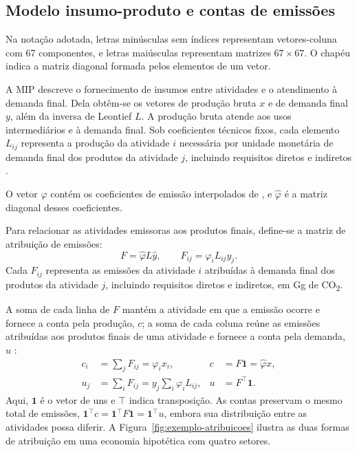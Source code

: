 \subsection{Modelo insumo-produto e contas de emissões}
\label{sec:derivacao}
\label{sec:atribuicoes}

Na notação adotada, letras minúsculas sem índices representam vetores-coluna com 67 componentes, e letras maiúsculas representam matrizes $67\times67$. O chapéu indica a matriz diagonal formada pelos elementos de um vetor.

A MIP descreve o fornecimento de insumos entre atividades e o atendimento à demanda final. Dela obtêm-se os vetores de produção bruta $x$ e de demanda final $y$, além da inversa de Leontief $L$. A produção bruta atende aos usos intermediários e à demanda final. Sob coeficientes técnicos fixos, cada elemento $L_{ij}$ representa a produção da atividade $i$ necessária por unidade monetária de demanda final dos produtos da atividade $j$, incluindo requisitos diretos e indiretos \parencite{millerBlair2009}.

O vetor $\varphi$ contém os coeficientes de emissão interpolados de \textcite{sanguinetAzzoni2024}, e $\widehat{\varphi}$ é a matriz diagonal desses coeficientes.

Para relacionar as atividades emissoras aos produtos finais, define-se a matriz de atribuição de emissões:
\begin{equation}
F=\widehat{\varphi}L\widehat y,\qquad F_{ij}=\varphi_iL_{ij}y_j.
\label{eq:matriz-atribuicao}
\end{equation}
Cada $F_{ij}$ representa as emissões da atividade $i$ atribuídas à demanda final dos produtos da atividade $j$, incluindo requisitos diretos e indiretos, em Gg de CO\textsubscript{2}.

A soma de cada linha de $F$ mantém a atividade em que a emissão ocorre e fornece a conta pela produção, $c$; a soma de cada coluna reúne as emissões atribuídas aos produtos finais de uma atividade e fornece a conta pela demanda, $u$ \parencite{marques2012}:
\begin{align}
c_i&=\sum_jF_{ij}=\varphi_i x_i, & c&=F\mathbf{1}=\widehat{\varphi}x,
\label{eq:conta-producao}
\\
u_j&=\sum_iF_{ij}=y_j\sum_i\varphi_iL_{ij}, & u&=F^\top\mathbf{1}.
\label{eq:conta-demanda}
\end{align}
Aqui, $\mathbf{1}$ é o vetor de uns e $\top$ indica transposição. As contas preservam o mesmo total de emissões, $\mathbf{1}^\top c=\mathbf{1}^\top F\mathbf{1}=\mathbf{1}^\top u$, embora sua distribuição entre as atividades possa diferir. A Figura~\ref{fig:exemplo-atribuicoes} ilustra as duas formas de atribuição em uma economia hipotética com quatro setores.

